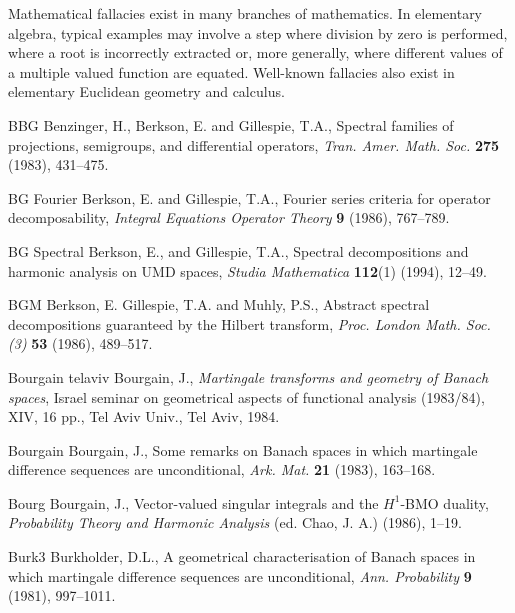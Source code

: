 \documentclass[12pt]{UNSWthesis}
\numberwithin{equation}{section}
\begin{document}
\noindent Mathematical fallacies exist in many branches of mathematics. In elementary algebra, typical examples may involve a step where division by zero is performed, where a root is incorrectly extracted or, more generally, where different values of a multiple valued function are equated. Well-known fallacies also exist in elementary Euclidean geometry and calculus.








\clearpage
{}


\begin{thebibliography}{999}

\bibitem
{BBG} Benzinger, H., Berkson, E. and Gillespie, T.A.,
Spectral families of projections, semigroups, and differential operators,
\textit{Tran. Amer. Math. Soc.} \textbf{275} (1983), 431--475.

\bibitem
{BG Fourier} Berkson, E. and Gillespie, T.A.,
Fourier series criteria for operator decomposability,
\textit{Integral Equations Operator Theory} \textbf{9} (1986), 767--789.

\bibitem
{BG Spectral} Berkson, E., and Gillespie, T.A.,
Spectral decompositions and harmonic analysis on UMD spaces,
\textit{Studia Mathematica} \textbf{112}(1) (1994), 12--49.

\bibitem
{BGM} Berkson, E. Gillespie, T.A. and Muhly, P.S.,
Abstract spectral decompositions guaranteed by the Hilbert transform,
\textit{Proc. London Math. Soc. (3)} \textbf{53} (1986), 489--517.

\bibitem
{Bourgain telaviv} 
Bourgain, J., {\em Martingale transforms and geometry of Banach spaces},
Israel seminar on geometrical aspects of functional analysis
(1983/84), XIV, 16 pp., Tel Aviv Univ., Tel Aviv, 1984.

\bibitem
{Bourgain} Bourgain, J.,
Some remarks on Banach spaces in which martingale difference sequences are
unconditional,
\textit{Ark. Mat.} \textbf{21} (1983), 163--168.

\bibitem
{Bourg} Bourgain, J.,
Vector-valued singular integrals and the $H^1$-BMO duality,
\textit{Probability Theory and Harmonic Analysis} (ed. Chao, J. A.) (1986), 
1--19.

\bibitem
{Burk3} Burkholder, D.L.,
A geometrical characterisation of Banach spaces in which martingale difference
sequences are unconditional,
\textit{Ann. Probability} \textbf{9} (1981), 997--1011.


\end{thebibliography}
\end{document}
